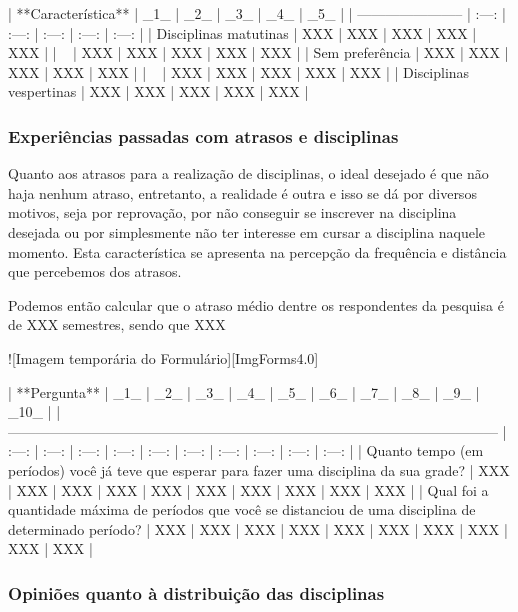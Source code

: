 | **Característica**      |  _1_  |  _2_  |  _3_  |  _4_  |  _5_  |
| ----------------------- | :---: | :---: | :---: | :---: | :---: |
| Disciplinas matutinas   |  XXX  |  XXX  |  XXX  |  XXX  |  XXX  |
| ~                       |  XXX  |  XXX  |  XXX  |  XXX  |  XXX  |
| Sem preferência         |  XXX  |  XXX  |  XXX  |  XXX  |  XXX  |
| ~                       |  XXX  |  XXX  |  XXX  |  XXX  |  XXX  |
| Disciplinas vespertinas |  XXX  |  XXX  |  XXX  |  XXX  |  XXX  |

\subsubsection{Experiências passadas com atrasos e disciplinas} %

Quanto aos atrasos para a realização de disciplinas, o ideal desejado é que não haja nenhum atraso, entretanto, a realidade é outra e isso se dá por diversos motivos, seja por reprovação, por não conseguir se inscrever na disciplina desejada ou por simplesmente não ter interesse em cursar a disciplina naquele momento. Esta característica se apresenta na percepção da frequência e distância que percebemos dos atrasos.

Podemos então calcular que o atraso médio dentre os respondentes da pesquisa é de XXX semestres, sendo que XXX%

![Imagem temporária do Formulário][ImgForms4.0]

| **Pergunta**                                                                                              |  _1_  |  _2_  |  _3_  |  _4_  |  _5_  |  _6_  |  _7_  |  _8_  |  _9_  | _10_  |
| --------------------------------------------------------------------------------------------------------- | :---: | :---: | :---: | :---: | :---: | :---: | :---: | :---: | :---: | :---: |
| Quanto tempo (em períodos) você já teve que esperar para fazer uma disciplina da sua grade?               |  XXX  |  XXX  |  XXX  |  XXX  |  XXX  |  XXX  |  XXX  |  XXX  |  XXX  |  XXX  |
| Qual foi a quantidade máxima de períodos que você se distanciou de uma disciplina de determinado período? |  XXX  |  XXX  |  XXX  |  XXX  |  XXX  |  XXX  |  XXX  |  XXX  |  XXX  |  XXX  |

\subsubsection{Opiniões quanto à distribuição das disciplinas} %

